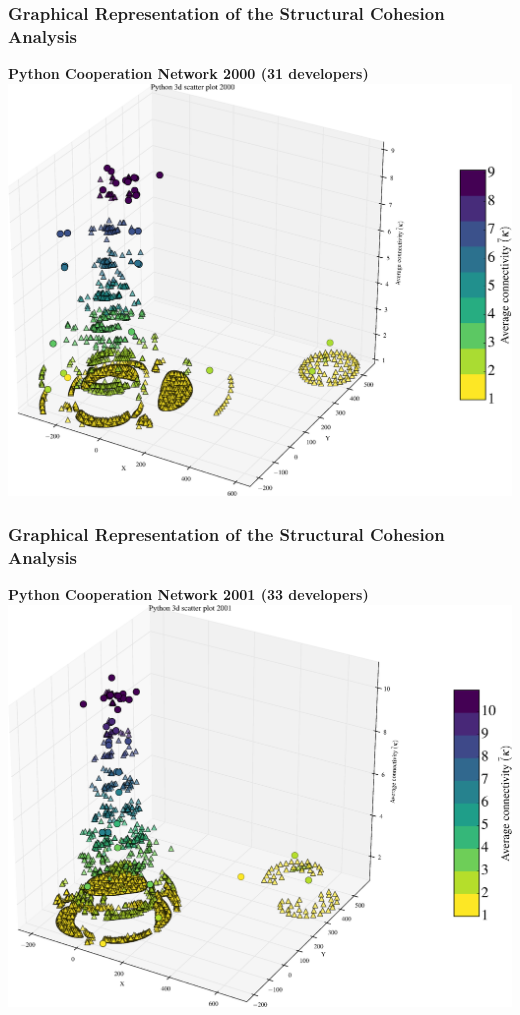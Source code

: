 \documentclass[ignorenonframetext,red,8pt,notes=hide]{beamer}
\begin{document}
\begin{frame}
\frametitle{Graphical Representation of the Structural Cohesion Analysis}

\begin{center}
\textbf{Python Cooperation Network 2000 (31 developers)}
\includegraphics[scale=0.25]{img/3d_scatter_python_2000}
\end{center}

\end{frame}

\begin{frame}
\frametitle{Graphical Representation of the Structural Cohesion Analysis}

\begin{center}
\textbf{Python Cooperation Network 2001 (33 developers)}
\includegraphics[scale=0.25]{img/3d_scatter_python_2001}
\end{center}

\end{frame}
\end{document}
